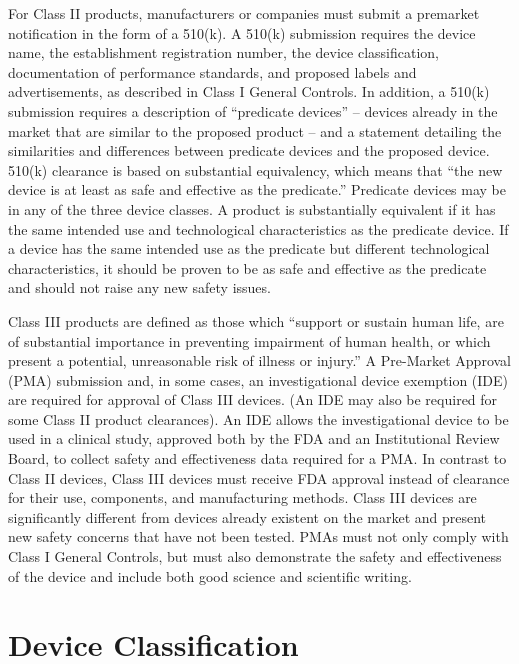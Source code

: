 \documentclass{article}
\begin{document}
For Class II products, manufacturers or companies must submit a
premarket notification in the form of a 510(k). A 510(k) submission
requires the device name, the establishment registration number, the
device classification, documentation of performance standards, and
proposed labels and advertisements, as described in Class I General
Controls. In addition, a 510(k) submission requires a description of
“predicate devices” – devices already in the market that are similar
to the proposed product – and a statement detailing the similarities
and differences between predicate devices and the proposed
device. 510(k) clearance is based on substantial equivalency, which
means that “the new device is at least as safe and effective as the
predicate.” Predicate devices may be in any of the three device
classes. A product is substantially equivalent if it has the same
intended use and technological characteristics as the predicate
device. If a device has the same intended use as the predicate but
different technological characteristics, it should be proven to be as
safe and effective as the predicate and should not raise any new
safety issues.

Class III products are defined as those which “support or sustain
human life, are of substantial importance in preventing impairment of
human health, or which present a potential, unreasonable risk of
illness or injury.” A Pre-Market Approval (PMA) submission and, in
some cases, an investigational device exemption (IDE) are required for
approval of Class III devices. (An IDE may also be required for some
Class II product clearances). An IDE allows the investigational device
to be used in a clinical study, approved both by the FDA and an
Institutional Review Board, to collect safety and effectiveness data
required for a PMA.  In contrast to Class II devices, Class III
devices must receive FDA approval instead of clearance for their use,
components, and manufacturing methods. Class III devices are
significantly different from devices already existent on the market
and present new safety concerns that have not been tested. PMAs must
not only comply with Class I General Controls, but must also
demonstrate the safety and effectiveness of the device and include
both good science and scientific writing.
	 

\section{Device Classification}
\label{sec:protocols}
\end{document}
